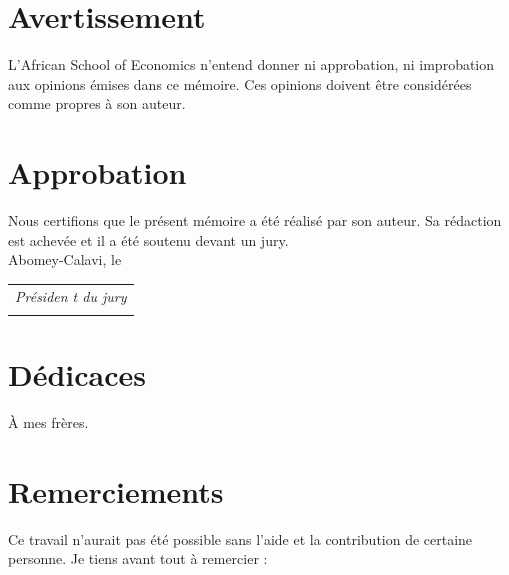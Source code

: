 \section*{Avertissement}\label{avertissement}

L'African School of Economics n'entend donner ni approbation, ni
improbation aux opinions émises dans ce mémoire. Ces opinions doivent
être considérées comme propres à son auteur.

\section*{Approbation}\label{approbation}

Nous certifions que le présent mémoire a été réalisé par son auteur. Sa
rédaction est achevée et il a été soutenu devant un jury.\\
Abomey-Calavi, le\\

\begin{longtable}[]{@{}c@{}}
\toprule\noalign{}
\endhead
\bottomrule\noalign{}
\endlastfoot
\emph{Présiden t du jury} \\
 \\
\end{longtable}

\section*{Dédicaces}\label{duxe9dicaces}

{À mes frères.}

\section*{Remerciements}\label{remerciements}

Ce travail n'aurait pas été possible sans l'aide et la contribution de
certaine personne. Je tiens avant tout à remercier :


